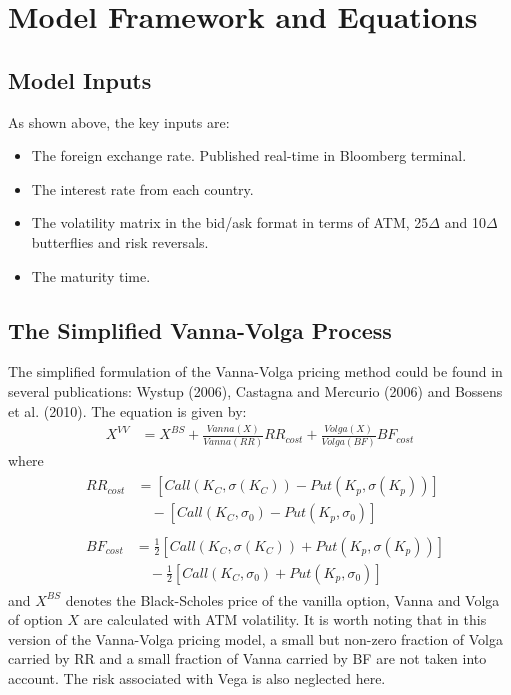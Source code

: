 \section{Model Framework and Equations}
\subsection{Model Inputs}
As shown above, the key inputs are:
\begin{itemize}
	\item The foreign exchange rate. Published real-time in Bloomberg terminal.
	\item The interest rate from each country.
	\item The volatility matrix in the bid/ask format in terms of ATM, 25$\Delta$ and 10$\Delta$ butterflies and risk reversals.
	\item The maturity time.
\end{itemize}

\subsection{The Simplified Vanna-Volga Process}
The simplified formulation of the Vanna-Volga pricing method could be found in several publications: Wystup (2006), Castagna and Mercurio (2006) and Bossens et al. (2010).
The equation is given by:
\begin{align}
X^{VV} &= X^{BS} + \frac{Vanna(X)}{Vanna(RR)}RR_{cost}+ \frac{Volga(X)}{Volga(BF)}BF_{cost}
\end{align}
where
\begin{align}
&\begin{aligned}
RR_{cost} &= \left[Call\left( K_C,\sigma\left( K_C\right) \right) -Put\left( K_p,\sigma\left( K_p\right) \right)\right] \\
&\quad - \left[Call\left( K_C,\sigma_0 \right) -Put\left( K_p,\sigma_0 \right)\right]
\end{aligned} \\
&\begin{aligned}
BF_{cost} &= \frac{1}{2} \left[Call\left( K_C,\sigma\left( K_C\right) \right) +Put\left( K_p,\sigma\left( K_p\right) \right)\right] \\
&\quad - \frac{1}{2}\left[Call\left( K_C,\sigma_0 \right) + Put\left( K_p,\sigma_0 \right)\right]
\end{aligned}
\end{align}
and $X^{BS}$ denotes the Black-Scholes price of the vanilla option, Vanna and Volga of option $X$ are calculated with ATM volatility. \newline
\newline
It is worth noting that in this version of the Vanna-Volga pricing model, a small but non-zero fraction of Volga carried by RR and a small fraction of Vanna carried by BF are not taken into account. The risk associated with Vega is also neglected here.

